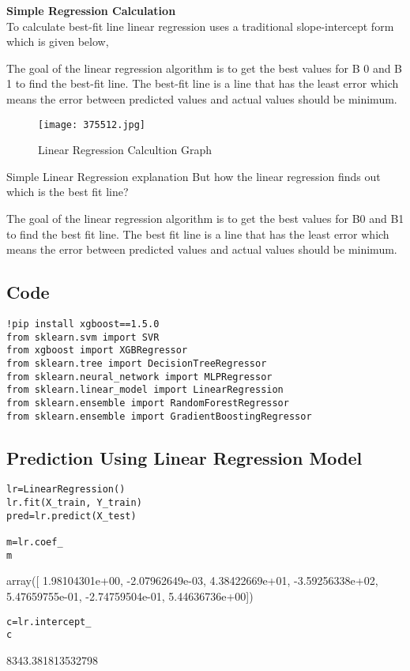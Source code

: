 \documentclass[12pt,a4paper]{report}
\begin{document}
\textbf{Simple Regression Calculation}\\
To calculate best-fit line linear regression uses a traditional slope-intercept form which is given below,

The goal of the linear regression algorithm is to get the best values for B 0 and B 1 to find the best-fit line. The best-fit line is a line that has the least error which means the error between predicted values and actual values should be minimum.
\begin{figure} [!ht]
    \centering
    \texttt{[image: 375512.jpg]}
    \caption{Linear Regression Calcultion Graph}
    \label{fig:enter-label}
\end{figure}
Simple Linear Regression explanation
But how the linear regression finds out which is the best fit line?

The goal of the linear regression algorithm is to get the best values for B0 and B1 to find the best fit line. The best fit line is a line that has the least error which means the error between predicted values and actual values should be minimum.
\subsection{Code}
\begin{lstlisting}
!pip install xgboost==1.5.0 
from sklearn.svm import SVR 
from xgboost import XGBRegressor 
from sklearn.tree import DecisionTreeRegressor 
from sklearn.neural_network import MLPRegressor 
from sklearn.linear_model import LinearRegression 
from sklearn.ensemble import RandomForestRegressor 
from sklearn.ensemble import GradientBoostingRegressor 
\end{lstlisting}
\subsection{Prediction Using Linear Regression 
Model}
\begin{lstlisting}
lr=LinearRegression()
lr.fit(X_train, Y_train)
pred=lr.predict(X_test)

m=lr.coef_
m
\end{lstlisting}
array([ 1.98104301e+00, -2.07962649e-03,  4.38422669e+01, -3.59256338e+02, 5.47659755e-01, -2.74759504e-01,  5.44636736e+00])
\begin{lstlisting}
c=lr.intercept_
c
\end{lstlisting}
8343.381813532798
\end{document}
